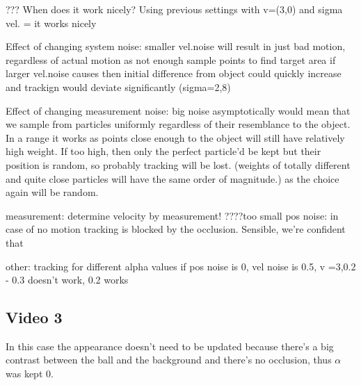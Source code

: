 \documentclass[10pt,a4paper,twoside]{article}
\begin{document}
??? When does it work nicely?
Using previous settings with v=(3,0) and sigma vel. =  it works nicely


Effect of changing system noise:
smaller vel.noise will result in just bad motion, regardless of actual motion as not enough sample points to find target area
if larger vel.noise causes then initial difference from object could quickly increase and trackign would deviate significantly
(sigma=2,8)

Effect of changing measurement noise:
big noise asymptotically would mean that we sample from particles uniformly regardless of their resemblance to the object.
In a range it works as points close enough to the object will still have
relatively high weight. If too high, then only the perfect particle'd be kept but
their position is random, so probably tracking will be lost. (weights of totally
different and quite close particles will have the same order of magnitude.) as the choice again will be random.

measurement: determine velocity by measurement!
????too small pos noise: in case of no motion tracking is blocked by the occlusion. Sensible, we're confident that 




other:
tracking for different alpha values if pos noise is 0, vel noise is 0.5, v =3,0.2
 - 0.3 doesn't work, 0.2 works


\subsection{Video 3}
In this case the appearance doesn't need to be updated because there's a big
contrast between the ball and the background and there's no occlusion, thus
$\alpha$ was kept 0.
\end{document}
